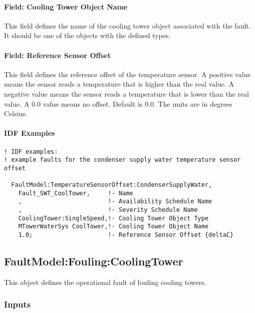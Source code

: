 \paragraph{Field: Cooling Tower Object Name}\label{field-tower-object-name}

This field defines the name of the cooling tower object associated with the fault. It should be one of the objects with the defined types.

\paragraph{Field: Reference Sensor Offset}\label{field-reference-sensor-offset}

This field defines the reference offset of the temperature sensor. A positive value means the sensor reads a temperature that is higher than the real value. A negative value means the sensor reads a temperature that is lower than the real value. A 0.0 value means no offset. Default is 0.0. The units are in degrees Celsius.

\paragraph{IDF Examples}

\begin{lstlisting}
! IDF examples:
! example faults for the condenser supply water temperature sensor offset

  FaultModel:TemperatureSensorOffset:CondenserSupplyWater,
    Fault_SWT_CoolTower,     !- Name
    ,                        !- Availability Schedule Name
    ,                        !- Severity Schedule Name
    CoolingTower:SingleSpeed,!- Cooling Tower Object Type
    MTowerWaterSys CoolTower,!- Cooling Tower Object Name
    1.0;                     !- Reference Sensor Offset {deltaC}

\end{lstlisting}


\subsection{FaultModel:Fouling:CoolingTower}\label{faultmodelfoulingcoolingtower}

This object defines the operational fault of fouling cooling towers.

\subsubsection{Inputs}

